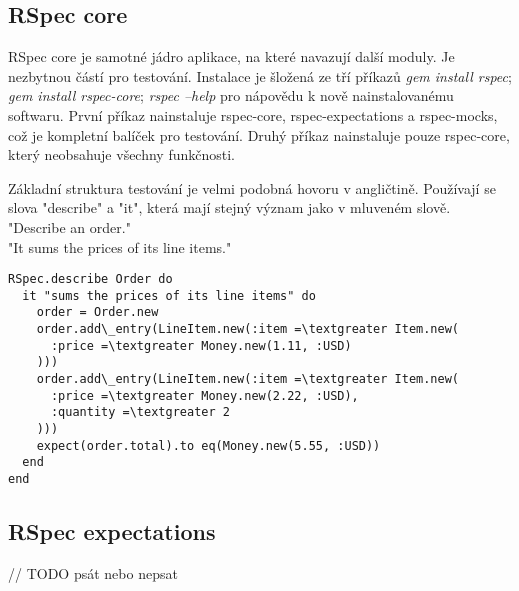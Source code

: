 \subsection{RSpec core}
\par RSpec core je samotné jádro aplikace, na které navazují další moduly. Je nezbytnou částí pro testování. Instalace je šložená ze tří příkazů \textit{gem install rspec}; \textit{gem install rspec-core}; \textit{rspec --help} pro nápovědu k nově nainstalovanému softwaru. První příkaz nainstaluje rspec-core, rspec-expectations a rspec-mocks, což je kompletní balíček pro testování. Druhý příkaz nainstaluje pouze rspec-core, který neobsahuje všechny funkčnosti.
\par Základní struktura testování je velmi podobná hovoru v angličtině. Používají se slova "describe" a "it", která mají stejný význam jako v mluveném slově.\\
"Describe an order."\\
"It sums the prices of its line items."\\
\begin{verbatim}
RSpec.describe Order do
  it "sums the prices of its line items" do
    order = Order.new
    order.add\_entry(LineItem.new(:item =\textgreater Item.new(
      :price =\textgreater Money.new(1.11, :USD)
    )))
    order.add\_entry(LineItem.new(:item =\textgreater Item.new(
      :price =\textgreater Money.new(2.22, :USD),
      :quantity =\textgreater 2
    )))
    expect(order.total).to eq(Money.new(5.55, :USD))
  end
end
\end{verbatim}

\subsection{RSpec expectations}
// TODO psát nebo nepsat
